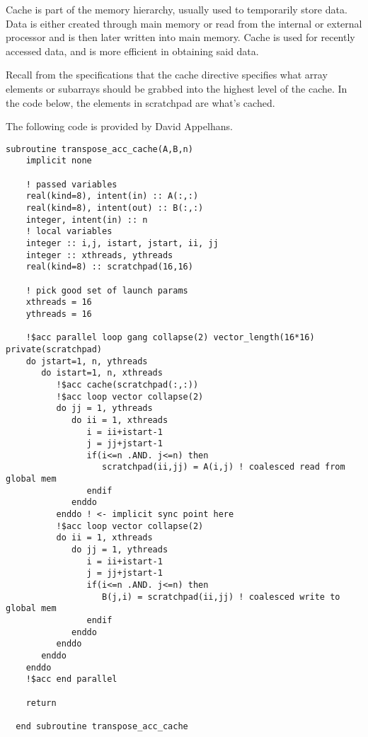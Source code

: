 Cache is part of the memory hierarchy, usually used to temporarily store data. Data is either created through main memory or read from the internal or external processor and is then later written into main memory. Cache is used for recently accessed data, and is more efficient in obtaining said data. 

Recall from the specifications that the cache directive specifies what array elements or subarrays should be grabbed into the highest level of the cache. In the code below, the elements in scratchpad are what's cached.

The following code is provided by David Appelhans. 

\begin{Code}
\begin{lstlisting}[frame=single, caption=cache with matrix transpose, label=prototype, numbers=none]
subroutine transpose_acc_cache(A,B,n) 
    implicit none

    ! passed variables
    real(kind=8), intent(in) :: A(:,:)
    real(kind=8), intent(out) :: B(:,:)   
    integer, intent(in) :: n
    ! local variables
    integer :: i,j, istart, jstart, ii, jj
    integer :: xthreads, ythreads
    real(kind=8) :: scratchpad(16,16)
    
    ! pick good set of launch params
    xthreads = 16
    ythreads = 16

    !$acc parallel loop gang collapse(2) vector_length(16*16) private(scratchpad)
    do jstart=1, n, ythreads 
       do istart=1, n, xthreads
          !$acc cache(scratchpad(:,:))
          !$acc loop vector collapse(2)
          do jj = 1, ythreads
             do ii = 1, xthreads
                i = ii+istart-1
                j = jj+jstart-1
                if(i<=n .AND. j<=n) then
                   scratchpad(ii,jj) = A(i,j) ! coalesced read from global mem
                endif
             enddo
          enddo ! <- implicit sync point here
          !$acc loop vector collapse(2)
          do ii = 1, xthreads
             do jj = 1, ythreads
                i = ii+istart-1
                j = jj+jstart-1
                if(i<=n .AND. j<=n) then
                   B(j,i) = scratchpad(ii,jj) ! coalesced write to global mem
                endif
             enddo
          enddo
       enddo
    enddo    
    !$acc end parallel
    
    return

  end subroutine transpose_acc_cache
\end{lstlisting}
\end{Code}